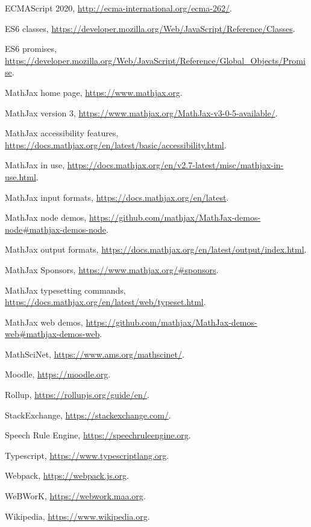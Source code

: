 \documentclass{article}
\begin{document}
\small
\begin{thebibliography}{99}

  ECMAScript 2020, \url{http://ecma-international.org/ecma-262/}.

  ES6 classes, \url{https://developer.mozilla.org/Web/JavaScript/Reference/Classes}.
  
  ES6 promises, \url{https://developer.mozilla.org/Web/JavaScript/Reference/Global\_Objects/Promise}.

  MathJax home page, \url{https://www.mathjax.org}.

  MathJax version 3, \url{https://www.mathjax.org/MathJax-v3-0-5-available/}.

  MathJax accessibility features, \url{https://docs.mathjax.org/en/latest/basic/accessibility.html}.

  MathJax in use, \url{https://docs.mathjax.org/en/v2.7-latest/misc/mathjax-in-use.html}.

  MathJax input formats, \url{https://docs.mathjax.org/en/latest}.
  
  MathJax node demos, \url{https://github.com/mathjax/MathJax-demos-node\#mathjax-demos-node}.

  MathJax output formats, \url{https://docs.mathjax.org/en/latest/output/index.html}.

  MathJax Sponsors, \url{https://www.mathjax.org/\#sponsors}.

  MathJax typesetting commands, \url{https://docs.mathjax.org/en/latest/web/typeset.html}.

  MathJax web demos, \url{https://github.com/mathjax/MathJax-demos-web\#mathjax-demos-web}.

  MathSciNet, \url{https://www.ams.org/mathscinet/}.

  Moodle, \url{https://moodle.org}.

  Rollup, \url{https://rollupjs.org/guide/en/}.

  StackExchange, \url{https://stackexchange.com/}.

  Speech Rule Engine, \url{https://speechruleengine.org}.

  Typescript, \url{https://www.typescriptlang.org}.

  Webpack, \url{https://webpack.js.org}.

  WeBWorK, \url{https://webwork.maa.org}.

  Wikipedia, \url{https://www.wikipedia.org}.

\end{thebibliography}
\end{document}
